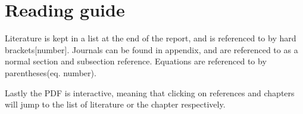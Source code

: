 \documentclass[../../main]{subfiles}
\begin{document}
\section*{Reading guide}
\label{sec:reading_guide}
Literature is kept in a list at the end of the report, and is referenced to by hard brackets[number].
Journals can be found in appendix, and are referenced to as a normal section and subsection reference.
Equations are referenced to by parentheses(eq. number).

Lastly the PDF is interactive, meaning that clicking on references and chapters will jump to the list of literature or the chapter respectively.
\end{document}
